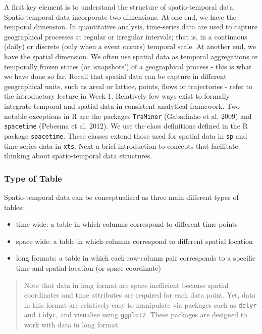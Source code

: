 \documentclass[
  letterpaper,
  krantz2]{style/krantz}
\begin{document}
A first key element is to understand the structure of spatio-temporal
data. Spatio-temporal data incorporate two dimensions. At one end, we
have the temporal dimension. In quantitative analysis, time-series data
are used to capture geographical processes at regular or irregular
intervals; that is, in a continuous (daily) or discrete (only when a
event occurs) temporal scale. At another end, we have the spatial
dimension. We often use spatial data as temporal aggregations or
temporally frozen states (or `snapshots') of a geographical process -
this is what we have done so far. Recall that spatial data can be
capture in different geographical units, such as areal or lattice,
points, flows or trajectories - refer to the introductory lecture in
Week 1. Relatively few ways exist to formally integrate temporal and
spatial data in consistent analytical framework. Two notable exceptions
in R are the packages \texttt{TraMiner} (Gabadinho et al. 2009) and
\texttt{spacetime} (Pebesma et al. 2012). We use the class definitions
defined in the R package \texttt{spacetime}. These classes extend those
used for spatial data in \texttt{sp} and time-series data in
\texttt{xts}. Next a brief introduction to concepts that facilitate
thinking about spatio-temporal data structures.

\hypertarget{type-of-table}{%
\subsubsection{Type of Table}\label{type-of-table}}

Spatio-temporal data can be conceptualised as three main different types
of tables:

\begin{itemize}
\item
  time-wide: a table in which columns correspond to different time
  points
\item
  space-wide: a table in which columns correspond to different spatial
  location
\item
  long formats: a table in which each row-column pair corresponds to a
  specific time and spatial location (or space coordinate)
\end{itemize}

\begin{quote}
Note that data in long format are space inefficient because spatial
coordinates and time attributes are required for each data point. Yet,
data in this format are relatively easy to manipulate via packages such
as \texttt{dplyr} and \texttt{tidyr}, and visualise using
\texttt{ggplot2}. These packages are designed to work with data in long
format.
\end{quote}
\end{document}
